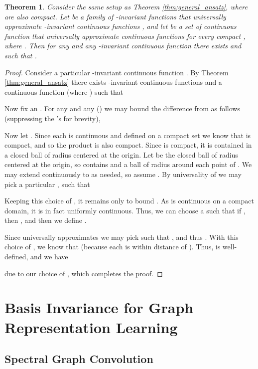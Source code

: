 \documentclass{article} \usepackage{iclr2023_conference,times}
\newtheorem{theorem}{Theorem}
\begin{document}
\begin{theorem}\label{thm:decomp_universal}
Consider the same setup as Theorem \ref{thm:general_ansatz}, where  are also compact.
Let  be a family of -invariant functions that universally approximate -invariant continuous functions , and let  be a set of continuous function that universally approximate continuous functions  for every compact , where . Then for any  and any -invariant continuous function  there exists  and  such that .
\end{theorem}
\begin{proof}
Consider a particular -invariant continuous function . By Theorem \ref{thm:general_ansatz}  there exists  -invariant  continuous functions  and a continuous function  (where ) such that
     
Now fix an . For any  and any   () we may bound the difference from  as follows (suppressing the 's for brevity),

Now let . Since each  is continuous and defined on a compact set  we know that  is compact, and so the product  is also compact. Since  is compact, it is contained in a closed ball  of radius  centered at the origin. Let  be the closed ball  of radius  centered at the origin, so  contains  and a ball of radius  around each point of . We may extend  continuously to  as needed, so assume . By universality of  we may pick a particular ,  such that 

Keeping this choice of , it remains only to bound . As  is continuous on a compact domain, it is in fact uniformly continuous. Thus, we can choose a  such that if , then , and then we define .


Since  universally approximates   we may pick  such that , and thus . With this choice of , we know that  (because each  is within distance  of ). Thus,  is well-defined, and we have

due to our choice of , which completes the proof.
 \end{proof}


\section{Basis Invariance for Graph Representation Learning}



\subsection{Spectral Graph Convolution}\label{appendix:spectral_conv}
\end{document}
